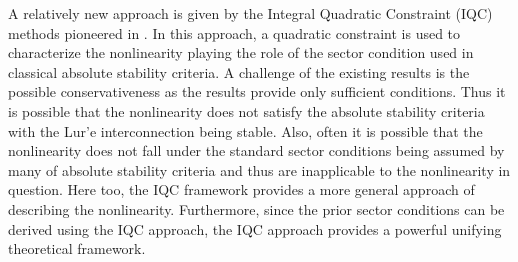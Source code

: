 \documentclass[letterpaper,10pt,conference,twocolumn]{IEEEtran}
\begin{document}
A relatively new approach
is given by the Integral Quadratic Constraint (IQC) methods pioneered in \cite{MegRan97}. In this approach, a quadratic constraint is used to characterize the nonlinearity playing the role of the sector condition used in classical absolute stability criteria. A challenge of the existing results is the possible conservativeness as the results  provide only sufficient conditions. Thus it is possible that the nonlinearity does not satisfy the absolute stability criteria with the Lur'e interconnection being stable. Also, often it is possible that the nonlinearity does not fall under the standard sector conditions being assumed by many of  absolute stability criteria and thus are inapplicable to the nonlinearity in question. Here too, the IQC framework provides a more general approach of describing the nonlinearity. Furthermore, since the prior sector conditions can be derived using the IQC approach, the IQC approach provides a powerful unifying theoretical framework.

\end{document}
